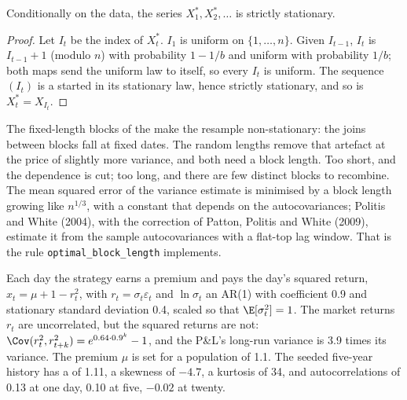 \begin{proposition}\label{prop:qm:resampling:stationary}
Conditionally on the data, the  series $X_1^*, X_2^*, \dots$ is strictly stationary.
\end{proposition}

\begin{proof}
Let $I_t$ be the index of $X_t^*$. $I_1$ is uniform on $\{1, \dots, n\}$. Given $I_{t-1}$, $I_t$ is $I_{t-1} + 1$ (modulo $n$) with
probability $1 - 1/b$ and uniform with probability $1/b$; both maps send the uniform law to itself, so every $I_t$ is uniform. The
sequence $(I_t)$ is a  started in its stationary law, hence strictly stationary, and so is $X_t^* = X_{I_t}$.
\end{proof}

The fixed-length blocks of the  make the resample non-stationary: the joins between blocks fall at fixed
dates. The random lengths remove that artefact at the price of slightly more variance, and both need a block length. Too short, and
the dependence is cut; too long, and there are few distinct blocks to recombine. The mean squared error of the variance estimate is
minimised by a block length growing like $n^{1/3}$, with a constant that depends on the autocovariances; Politis and White (2004),
with the correction of Patton, Politis and White (2009), estimate it from the sample autocovariances with a flat-top lag window.
That is the rule \texttt{optimal\_block\_length} implements.

\begin{example}\label{ex:qm:resampling:seller}
Each day the strategy earns a premium and pays the day's squared return, $x_t = \mu + 1 - r_t^2$, with $r_t = \sigma_t\varepsilon_t$ and
$\ln\sigma_t$ an AR(1) with coefficient 0.9 and stationary standard deviation 0.4, scaled so that $\E[\sigma_t^2] = 1$. The market
returns $r_t$ are uncorrelated, but the squared returns are not: $\Cov(r_t^2, r_{t+k}^2) = e^{0.64 \cdot 0.9^k} - 1$, and the P\&L's
long-run variance is 3.9 times its variance. The premium $\mu$ is set for a population  of 1.1. The seeded five-year
history has a  of 1.11, a skewness of $-4.7$, a kurtosis of 34, and autocorrelations of 0.13 at one day, 0.10 at five,
$-0.02$ at twenty.
\end{example}

